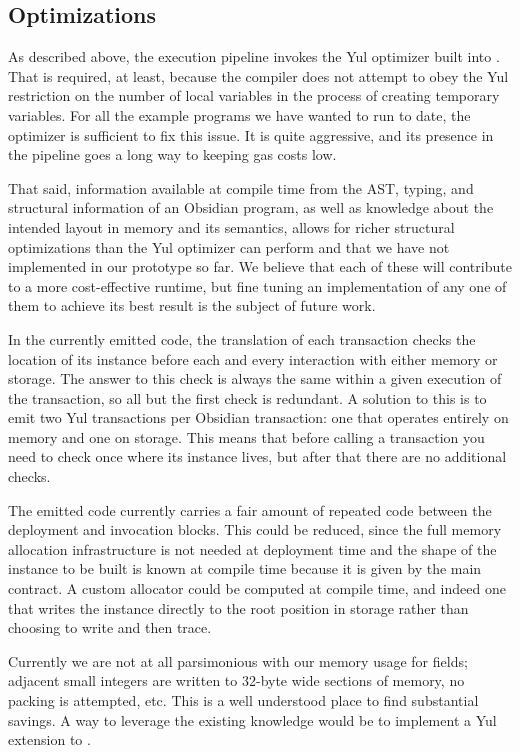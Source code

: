 \subsection{Optimizations}

As described above, the execution pipeline invokes the Yul optimizer built
into \solc. That is required, at least, because the compiler does not
attempt to obey the Yul restriction on the number of local variables in the
process of creating temporary variables. For all the example programs we
have wanted to run to date, the optimizer is sufficient to fix this
issue. It is quite aggressive, and its presence in the pipeline goes a long
way to keeping gas costs low.

That said, information available at compile time from the AST, typing, and
structural information of an Obsidian program, as well as knowledge about
the intended layout in memory and its semantics, allows for richer
structural optimizations than the Yul optimizer can perform and that we
have not implemented in our prototype so far. We believe that each of these
will contribute to a more cost-effective runtime, but fine tuning an
implementation of any one of them to achieve its best result is the subject
of future work.

In the currently emitted code, the translation of each transaction checks
the location of its instance before each and every interaction with either
memory or storage. The answer to this check is always the same within a
given execution of the transaction, so all but the first check is
redundant. A solution to this is to emit two Yul transactions per Obsidian
transaction: one that operates entirely on memory and one on storage. This
means that before calling a transaction you need to check once where its
instance lives, but after that there are no additional checks.

The emitted code currently carries a fair amount of repeated code between
the deployment and invocation blocks. This could be reduced, since the full
memory allocation infrastructure is not needed at deployment time and the
shape of the instance to be built is known at compile time because it is
given by the main contract. A custom allocator could be computed at compile
time, and indeed one that writes the instance directly to the root position
in storage rather than choosing to write and then trace.

Currently we are not at all parsimonious with our memory usage for fields;
adjacent small integers are written to 32-byte wide sections of memory, no
packing is attempted, etc. This is a well understood place to find
substantial savings. A way to leverage the existing knowledge would be to
implement a Yul extension to .

